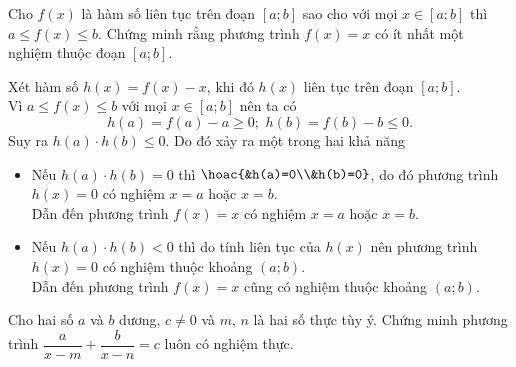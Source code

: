 \begin{bt}%
Cho $f(x)$ là hàm số liên tục trên đoạn $\left[a;b\right]$ sao cho với mọi $x\in \left[a;b\right]$ thì $a\le f(x)\le b$. Chứng minh rằng phương trình $f(x)=x$ có ít nhất một nghiệm thuộc đoạn $\left[a;b\right]$.
\loigiai
{Xét hàm số $h(x)=f(x)-x$, khi đó $h(x)$ liên tục trên đoạn $\left[a;b\right]$.\\
Vì $a\le f(x)\le b$ với mọi $x\in \left[a;b\right]$ nên ta có $$h(a)=f(a)-a\geq 0;\,\,h(b)=f(b)-b\le 0.$$
Suy ra $h(a)\cdot h(b)\le 0$. Do đó xảy ra một trong hai khả năng
\begin{itemize}
\item[•] Nếu $h(a)\cdot h(b)=0$ thì $\hoac{&h(a)=0\\&h(b)=0}$, do đó phương trình $h(x)=0$ có nghiệm $x=a$ hoặc $x=b$.\\
 Dẫn đến phương trình $f(x)=x$ có nghiệm $x=a$ hoặc $x=b$.
\item[•] Nếu $h(a)\cdot h(b)<0$ thì do tính liên tục của $h(x)$ nên phương trình $h(x)=0$ có nghiệm thuộc khoảng $(a;b)$.\\
 Dẫn đến phương trình $f(x)=x$ cũng có nghiệm thuộc khoảng $(a;b)$.
\end{itemize}
}
\end{bt}
\begin{bt}%
	Cho hai số $a$ và $b$ dương, $c\ne 0$ và $m$, $n$ là hai số thực tùy ý. Chứng minh phương trình $\dfrac{a}{x-m}+\dfrac{b}{x-n}=c$ luôn có nghiệm thực.
\end{bt}
